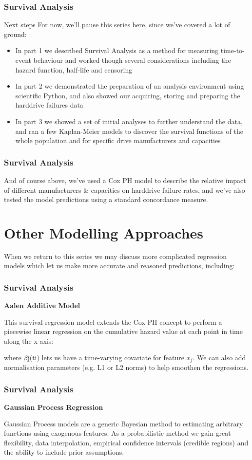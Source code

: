 \documentclass[]{beamer}
\begin{document}
	\begin{frame}
		\frametitle{Survival Analysis}
		Next steps
		For now, we'll pause this series here, since we've covered a lot of ground:
		\begin{itemize}
			\item In part 1 we described Survival Analysis as a method for measuring time-to-event behaviour and worked though several considerations including the hazard function, half-life and censoring
			\item In part 2 we demonstrated the preparation of an analysis environment using scientific Python, and also showed our acquiring, storing and preparing the harddrive failures data
			\item In part 3 we showed a set of initial analyses to further understand the data, and ran a few Kaplan-Meier models to discover the survival functions of the whole population and for specific drive manufacturers and capacities
		\end{itemize}
	\end{frame}
	\begin{frame}
		\frametitle{Survival Analysis}
		And of course above, we've used a Cox PH model to describe the relative impact of different manufacturers \& capacities on harddrive failure rates, and we've also tested the model predictions using a standard concordance measure.
	\end{frame}
	\section{Other Modelling Approaches}
	\begin{frame}
		When we return to this series we may discuss more complicated regression models which let us make more accurate and reasoned predictions, including:
	\end{frame}
	
	\begin{frame}
		\frametitle{Survival Analysis}
		\noindent \textbf{Aalen Additive Model}
		
		This survival regression model extends the Cox PH concept to perform a piecewise linear regression on the cumulative hazard value at each point in time along the x-axis:
		
		where $\beta$j(ti) lets us have a time-varying covariate for feature $x_j$. We can also add normalisation parameters (e.g. L1 or L2 norms) to help smoothen the regressions.
	\end{frame}
	\begin{frame}
		\frametitle{Survival Analysis}
		\noindent \textbf{Gaussian Process Regression}
		
		Gaussian Process models are a generic Bayesian method to estimating arbitrary functions using exogenous features. As a probabilistic method we gain great flexibility, data interpolation, empirical confidence intervals (credible regions) and the ability to include prior assumptions.
	\end{frame}
\end{document}
